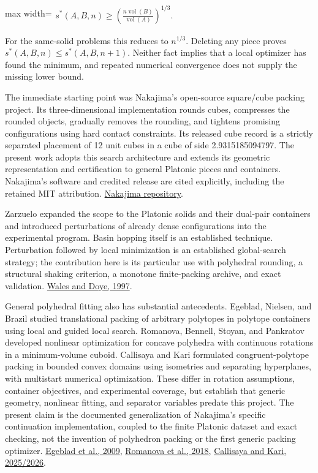 \documentclass[11pt,a4paper]{article}
\begin{document}
\begin{center}\begin{adjustbox}{max width=\linewidth}$\displaystyle\begin{aligned}
s^*(A,B,n)\ge \left(\frac{n\operatorname{vol}(B)}{\operatorname{vol}(A)}\right)^{1/3}.
\end{aligned}$\end{adjustbox}\end{center}

For the same-solid problems this reduces to \(n^{1/3}\). Deleting any piece proves \(s^*(A,B,n)\le s^*(A,B,n+1)\). Neither fact implies that a local optimizer has found the minimum, and repeated numerical convergence does not supply the missing lower bound.

The immediate starting point was Nakajima's open-source square/cube packing project. Its three-dimensional implementation rounds cubes, compresses the rounded objects, gradually removes the rounding, and tightens promising configurations using hard contact constraints. Its released cube record is a strictly separated placement of 12 unit cubes in a cube of side 2.9315185094797. The present work adopts this search architecture and extends its geometric representation and certification to general Platonic pieces and containers. Nakajima's software and credited release are cited explicitly, including the retained MIT attribution. \href{https://github.com/yoheinakajima/soft-to-rigid-packing}{Nakajima repository}.

Zarzuelo expanded the scope to the Platonic solids and their dual-pair containers and introduced perturbations of already dense configurations into the experimental program. Basin hopping itself is an established technique. Perturbation followed by local minimization is an established global-search strategy; the contribution here is its particular use with polyhedral rounding, a structural shaking criterion, a monotone finite-packing archive, and exact validation. \href{https://doi.org/10.1021/jp970984n}{Wales and Doye, 1997}.

General polyhedral fitting also has substantial antecedents. Egeblad, Nielsen, and Brazil studied translational packing of arbitrary polytopes in polytope containers using local and guided local search. Romanova, Bennell, Stoyan, and Pankratov developed nonlinear optimization for concave polyhedra with continuous rotations in a minimum-volume cuboid. Callisaya and Kari formulated congruent-polytope packing in bounded convex domains using isometries and separating hyperplanes, with multistart numerical optimization. These differ in rotation assumptions, container objectives, and experimental coverage, but establish that generic geometry, nonlinear fitting, and separator variables predate this project. The present claim is the documented generalization of Nakajima's specific continuation implementation, coupled to the finite Platonic dataset and exact checking, not the invention of polyhedron packing or the first generic packing optimizer. \href{https://doi.org/10.1016/j.comgeo.2008.06.003}{Egeblad et al., 2009}, \href{https://doi.org/10.1016/j.ejor.2018.01.025}{Romanova et al., 2018}, \href{https://www.scielo.br/j/tcam/a/nbGY4xC4KMxq7XbYZTybvHj/?format=html\&lang=en}{Callisaya and Kari, 2025/2026}.
\end{document}
